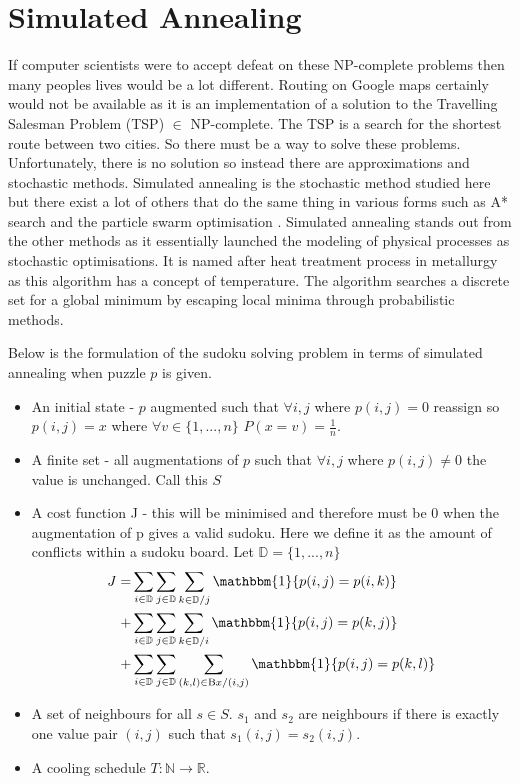 \documentclass[a4paper,11pt]{report}
\newcounter{row}
\begin{document}
{\section{Simulated Annealing} 

If computer scientists were to accept defeat on these NP-complete problems then many peoples lives would be a lot different. Routing on Google maps certainly would not be available as it is an implementation of a solution to the Travelling Salesman Problem (TSP) $\in$ NP-complete\cite{Applegate2006}. The TSP is a search for the shortest route between two cities. So there must be a way to solve these problems. Unfortunately, there is no solution so instead there are approximations and stochastic methods. Simulated annealing is the stochastic method studied here but there exist a lot of others that do the same thing in various forms such as A* search \cite{hart1968formal} and the particle swarm optimisation \cite{eberhart1995new}. Simulated annealing stands out from the other methods as it essentially launched the modeling of physical processes as stochastic optimisations. It is named after heat treatment process in metallurgy as this algorithm has a concept of temperature. The algorithm searches a discrete set for a global minimum by escaping local minima through probabilistic methods.

Below is the formulation of the sudoku solving problem in terms of simulated annealing when puzzle $p$ is given.
\begin{itemize}
\item An initial state - $p$ augmented such that $\forall i,j$ where $p(i,j)=0$ reassign so $p(i,j)=x$ where $\forall v \in \{1,...,n\}$  $P(x=v)=\frac{1}{n}$.
\item A finite set - all augmentations of $p$ such that $\forall i,j$ where $p(i,j)\neq0$ the value is unchanged. Call this $S$
\item A cost function J -  this will be minimised and therefore must be 0 when the augmentation of p gives a valid sudoku. Here we define it as the amount of conflicts within a sudoku board. Let $\mathbb{D}=\{1,...,n\}$
\begin{eqnarray}J=&\sum_{i\in\mathbb{D}}\sum_{j\in\mathbb{D}}\sum_{k\in\mathbb{D}/j} \mathbbm{1}\{p(i,j)=p(i,k)\}\\+&\sum_{i\in\mathbb{D}}\sum_{j\in\mathbb{D}}\sum_{k\in\mathbb{D}/i} \mathbbm{1}\{p(i,j)=p(k,j)\}\\+&\sum_{i\in\mathbb{D}}\sum_{j\in\mathbb{D}}\sum_{(k,l)\in\text{B}x/(i,j)} \mathbbm{1}\{p(i,j)=p(k,l)\}\end{eqnarray}
\item A set of neighbours for all $s\in S$. $s_1$ and $s_2$ are neighbours if there is exactly one value pair $(i,j)$ such that $s_1(i,j)=s_2(i,j)$.
\item A cooling schedule $T:\mathbb{N}\rightarrow\mathbb{R}$.
\end{itemize}

}
\end{document}
